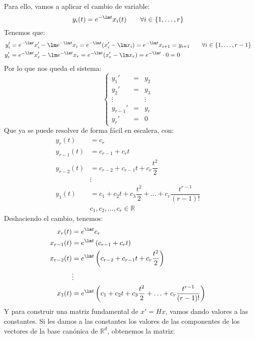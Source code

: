 Para ello, vamos a aplicar el cambio de variable:
\begin{equation*}
    y_i(t) = e^{-\lm t}x_i(t) \qquad \forall i \in \{1,\ldots,r\}
\end{equation*}
Tenemos que:
\begin{align*}
    y_i' &= e^{-\lm t} x_i' - \lm e^{-\lm t} x_i = e^{-\lm t}(x_i' - \lm x_i) = e^{-\lm t} x_{i+1} = y_{i+1} \qquad \forall i \in \{1,\ldots,r-1\}\\
    y_r' &= e^{-\lm t} x_r' - \lm e^{-\lm t} x_r = e^{-\lm t}(x_r' - \lm x_r) = e^{-\lm t} \cdot 0 = 0
\end{align*}
Por lo que nos queda el sistema:
\begin{equation*}
    \left\{\begin{array}{ccc}
            y_1' &=& y_2 \\
            y_2' &=& y_3 \\
                 \vdots &&\vdots \\
            y_{r-1}' &=& y_r \\
            y_r' &=& 0
    \end{array}\right.
\end{equation*}
Que ya se puede resolver de forma fácil en escalera, con:
\begin{align*}
    y_r(t) &= c_r \\
    y_{r-1}(t) &= c_{r-1} + c_r t \\
    y_{r-2}(t) &= c_{r-2} + c_{r-1}t + c_r \dfrac{t^2}{2} \\
               & \vdots \\
    y_1(t) &= c_1 + c_2t + c_3 \dfrac{t^2}{2} + \ldots + c_r \dfrac{t^{r-1}}{(r-1)!} \\
           &c_1,c_2,\ldots,c_r \in \mathbb{R}
\end{align*}
Deshaciendo el cambio, tenemos:
\begin{align*}
    x_r(t) &= e^{\lm t} c_r \\
    x_{r-1}(t) &= e^{\lm t} \left(c_{r-1} + c_r t\right) \\
    x_{r-2}(t) &= e^{\lm t} \left(c_{r-2} + c_{r-1}t + c_r \dfrac{t^2}{2}\right) \\
              & \vdots \\
    x_1(t) &= e^{\lm t} \left(c_1 + c_2t + c_3 \dfrac{t^2}{2} + \ldots + c_r \dfrac{t^{r-1}}{(r-1)!}\right)
\end{align*}
Y para construir una matriz fundamental de $x' = Hx$, vamos dando valores a las constantes. Si les damos a las constantes los valores de las componentes de los vectores de la base canónica de $\mathbb{R}^d$, obtenemos la matriz:
